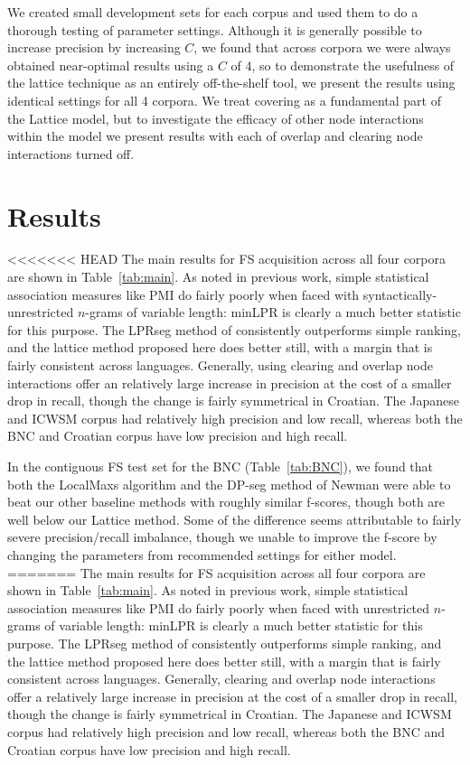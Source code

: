 \documentclass[11pt,letterpaper]{article}
\newcommand{\tabref}[2][]{Table#1~\ref{#2}\xspace}
\begin{document}
We created small development sets for each corpus and used them to do a thorough testing of parameter settings. Although it is generally possible to increase precision by increasing $C$, we found that across corpora we were always obtained near-optimal results using a $C$ of 4, so to demonstrate the usefulness of the lattice technique as an entirely off-the-shelf tool, we present the results using identical settings for all 4 corpora. We treat covering as a fundamental part of the Lattice model, but to investigate the efficacy of other node interactions within the model we present results with each of overlap and clearing node interactions turned off.
		

\section{Results}

<<<<<<< HEAD
The main results for FS acquisition across all four corpora are shown in \tabref{tab:main}. As noted in previous work, simple statistical association measures like PMI do fairly poorly when faced with syntactically-unrestricted $n$-grams of variable length: minLPR is clearly a much better statistic for this purpose. The LPRseg method of  consistently outperforms simple ranking, and the lattice method proposed here does better still, with a margin that is fairly consistent across languages. Generally, using clearing and overlap node interactions offer an relatively large increase in precision at the cost of a smaller drop in recall, though the change is fairly symmetrical in Croatian. The Japanese and ICWSM corpus had relatively high precision and low recall, whereas both the BNC and Croatian corpus have low precision and high recall.

In the contiguous FS test set for the BNC (\tabref{tab:BNC}), we found that both the LocalMaxs algorithm and the DP-seg method of Newman \cite{Newman12} were able to beat our other baseline methods with roughly similar f-scores, though both are well below our Lattice method. Some of the difference seems attributable to fairly severe precision/recall imbalance, though we unable to improve the f-score by changing the parameters from recommended settings for either model.
=======
The main results for FS acquisition across all four corpora are shown in \tabref{tab:main}. As noted in previous work, simple statistical association measures like PMI do fairly poorly when faced with unrestricted $n$-grams of variable length: minLPR is clearly a much better statistic for this purpose. The LPRseg method of  consistently outperforms simple ranking, and the lattice method proposed here does better still, with a margin that is fairly consistent across languages. Generally, clearing and overlap node interactions offer a relatively large increase in precision at the cost of a smaller drop in recall, though the change is fairly symmetrical in Croatian. The Japanese and ICWSM corpus had relatively high precision and low recall, whereas both the BNC and Croatian corpus have low precision and high recall.
\end{document}
